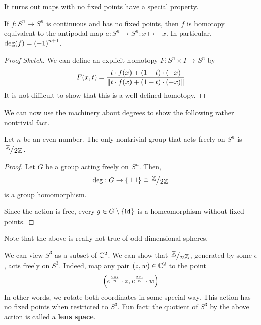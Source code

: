 It turns out maps with no fixed points have a special property.

\begin{boxlemma}
    If $f : S^n \to S^n$ is continuous and has no fixed points, then $f$ is homotopy equivalent to the antipodal map $a : S^n \to S^n : x \mapsto -x$. In particular, $\deg\!\left( f \right) = \left( -1 \right)^{n+1}$.
\end{boxlemma}
\begin{proof}[Proof Sketch]
    We can define an explicit homotopy $F : S^n \times I \to S^n$ by
    \begin{align*}
        F(x, t)
        = \frac{
            t \cdot f(x) + \left( 1-t \right) \cdot \left( -x \right)
        }{
            \left\lVert t \cdot f(x) + \left( 1-t \right) \cdot \left( -x \right) \right\rVert
        }
    \end{align*}
    It is not difficult to show that this is a well-defined homotopy.
\end{proof}

We can now use the machinery about degrees to show the following rather nontrivial fact.

\begin{boxtheorem}
    Let $n$ be an even number. The only nontrivial group that acts freely on $S^n$ is $\Zmod{2}$.
\end{boxtheorem}
\begin{proof}
    Let $G$ be a group acting freely on $S^n$. Then,
    \begin{align*}
        \deg : G \to \set{\pm 1} \cong \Zmod{2}
    \end{align*}
    is a group homomorphism.
    
    Since the action is free, every $g \in G \setminus \left\{ \operatorname{id} \right\}$ is a homeomorphism without fixed points. \sorry %
\end{proof}

Note that the above is really not true of odd-dimensional spheres.

\begin{boxcexample}
    We can view $S^3$ as a subset of $\mathbb{C}^2$. We can show that $\Zmod{n}$, generated by some $\epsilon$, acts freely on $S^3$. Indeed, map any pair $\left( z, w \right) \in \mathbb{C}^2$ to the point
    \begin{align*}
        \left( e^{\frac{2 \pi i}{n}} \cdot z, e^{\frac{2 \pi i}{n}} \cdot w \right)
    \end{align*}
    In other words, we rotate both coordinates in some special way. This action has no fixed points when restricted to $S^3$. Fun fact: the quotient of $S^3$ by the above action is called a \textbf{lens space}.
\end{boxcexample}

